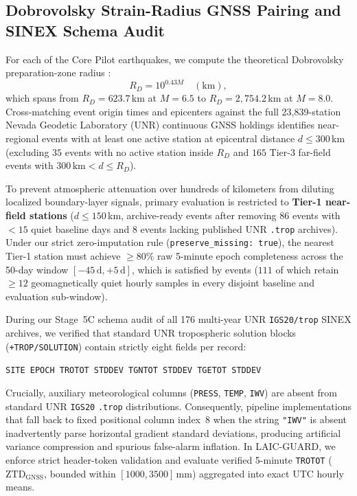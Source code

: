 ﻿\documentclass[journal]{IEEEtran}
\begin{document}
\subsection{Dobrovolsky Strain-Radius GNSS Pairing and SINEX Schema Audit}
For each of the \LgCorePilotIncluded{} Core Pilot earthquakes, we compute the theoretical Dobrovolsky preparation-zone radius \cite{dobrovolsky1979}:
\begin{equation}
    R_D = 10^{0.43 M}\quad (\text{km}),
    \label{eq:dobrovolsky}
\end{equation}
which spans from $R_D = 623.7$\,km at $M = 6.5$ to $R_D = 2{,}754.2$\,km at $M = 8.0$. Cross-matching event origin times and epicenters against the full 23,839-station Nevada Geodetic Laboratory (UNR) continuous GNSS holdings \cite{blewitt2018} identifies \LgNearRegionalCohort{} near-regional events with at least one active station at epicentral distance $d \le 300$\,km (excluding $35$ events with no active station inside $R_D$ and $165$ Tier-3 far-field events with $300\,\text{km} < d \le R_D$).

To prevent atmospheric attenuation over hundreds of kilometers from diluting localized boundary-layer signals, primary evaluation is restricted to \textbf{Tier-1 near-field stations} ($d \le 150$\,km, \LgTierOneReady{} archive-ready events after removing $86$ events with $<15$ quiet baseline days and $8$ events lacking published UNR \texttt{.trop} archives). Under our strict zero-imputation rule (\texttt{preserve\_missing: true}), the nearest Tier-1 station must achieve $\ge 80\%$ raw 5-minute epoch completeness across the 50-day window $[-45\,\text{d}, +5\,\text{d}]$, which is satisfied by \LgTierOneGnssQaPass{} events ($111$ of which retain $\ge 12$ geomagnetically quiet hourly samples in every disjoint baseline and evaluation sub-window).

During our Stage~5C schema audit of all 176 multi-year UNR \texttt{IGS20/trop} SINEX archives, we verified that standard UNR tropospheric solution blocks (\texttt{+TROP/SOLUTION}) contain strictly eight fields per record:
\begin{center}
{\scriptsize\texttt{SITE\ EPOCH\ TROTOT\ STDDEV\ TGNTOT\ STDDEV\ TGETOT\ STDDEV}}
\end{center}
Crucially, auxiliary meteorological columns (\texttt{PRESS}, \texttt{TEMP}, \texttt{IWV}) are absent from standard UNR \texttt{IGS20} \texttt{.trop} distributions. Consequently, pipeline implementations that fall back to fixed positional column index~8 when the string \texttt{"IWV"} is absent inadvertently parse horizontal gradient standard deviations, producing artificial variance compression and spurious false-alarm inflation. In LAIC-GUARD, we enforce strict header-token validation and evaluate verified 5-minute \texttt{TROTOT} ($\text{ZTD}_{\text{GNSS}}$, bounded within $[1000, 3500]$\,mm) aggregated into exact UTC hourly means.
\end{document}
